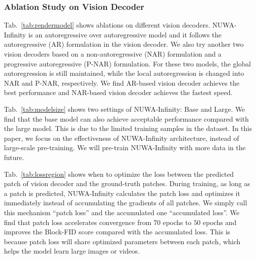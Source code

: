 \documentclass{article}
\begin{document}
\subsubsection{Ablation Study on Vision Decoder}\label{sec:ablvd}
Tab.~\ref{tab:rendermodel} shows ablations on different vision decoders. NUWA-Infinity is an autoregressive over autoregressive model and it follows the autoregressive (AR) formulation in the vision decoder. We also try another two vision decoders based on a non-autoregressive (NAR) formulation and a progressive autoregressive (P-NAR) formulation. For these two models, the global autoregression is still maintained, while the local autoregression is changed into NAR and P-NAR, respectively. We find AR-based vision decoder achieves the best performance and NAR-based vision decoder achieves the fastest speed.

Tab.~\ref{tab:modelsize} shows two settings of NUWA-Infinity: Base and Large. We find that the base model can also achieve acceptable performance compared with the large model. This is due to the limited training samples in the dataset. In this paper, we focus on the effectiveness of NUWA-Infinity architecture, instead of large-scale pre-training. We will pre-train NUWA-Infinity with more data in the future.


Tab.~\ref{tab:lossregion} shows when to optimize the loss between the predicted patch of vision decoder and the ground-truth patches. During training, as long as a patch is predicted, NUWA-Infinity calculates the patch loss and optimizes it immediately instead of accumulating the gradients of all patches. We simply call this mechanism ``patch loss'' and the accumulated one ``accumulated loss''. We find that patch loss accelerates convergence from $70$ epochs to $50$ epochs and improves the Block-FID score compared with the accumulated loss. This is because patch loss will share optimized parameters between each patch, which helps the model learn large images or videos.
\end{document}
